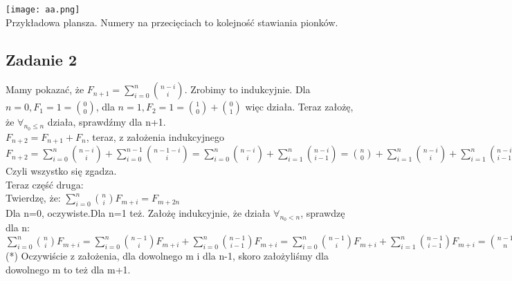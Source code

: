 \documentclass[a4paper]{article}
\begin{document}
\texttt{[image: aa.png]}\\
\small Przykładowa plansza. Numery na przecięciach to kolejność stawiania pionków.

\subsection*{Zadanie 2}
Mamy pokazać, że \Large $F_{n+1}=\sum\limits_{i=0}^{n} {n-i \choose i}$. \normalsize Zrobimy to indukcyjnie. Dla $n=0, F_1=1={0 \choose 0}$, dla $n=1, F_2=1={1 \choose 0}+{0 \choose 1}$ więc działa. Teraz założę, że $\forall_{n_0 \leq n}$ działa, sprawdźmy dla n+1.\\
$F_{n+2}=F_{n+1}+F_{n}$, teraz, z założenia indukcyjnego $F_{n+2}=\sum\limits_{i=0}^{n} {n-i \choose i} + \sum\limits_{i=0}^{n-1} {n-1-i \choose i} = \sum\limits_{i=0}^{n} {n-i \choose i} + \sum\limits_{i=1}^{n} {n-i \choose i-1} = {n \choose 0} + \sum\limits_{i=1}^{n} {n-i \choose i} + \sum\limits_{i=1}^{n} {n-i \choose i-1} = {n \choose 0} + [\sum\limits_{i=1}^{n} {n-i \choose i} + {n-i \choose i-1}] = {n \choose 0} + \sum\limits_{i=1}^{n} {n-i+1 \choose i} = {n+1 \choose 0} + \sum\limits_{i=1}^{n} {n-i+1 \choose i} = \sum\limits_{i=0}^{n} {n-i+1 \choose i} = {0 \choose n+1} + \sum\limits_{i=0}^{n} {n-i+1 \choose i} = \sum\limits_{i=0}^{n+1} {n-i+1 \choose i}$\\
Czyli wszystko się zgadza. \\
Teraz część druga:\\
Twierdzę, że: $\sum_{i=0}^n {n \choose i} F_{m+i} = F_{m+2n}$\\
Dla n=0, oczywiste.Dla n=1 też. Założę indukcyjnie, że działa $\forall_{n_0 < n}$, sprawdzę dla n:\\
$\displaystyle \sum_{i=0}^n {n \choose i} F_{m+i} = \sum_{i=0}^n {n-1 \choose i} F_{m+i} + \sum_{i=0}^n {n-1 \choose i-1} F_{m+i} = \sum_{i=0}^n {n-1 \choose i} F_{m+i} + \sum_{i=1}^n {n-1 \choose i-1} F_{m+i} = {n-1 \choose n} \sum_{i=0}^{n-1} {n-1 \choose i} F_{m+i} + \sum_{i=0}^{n-1} {n-1 \choose i} F_{m+i+1} \stackrel{*}{=} 0 + F_{m+2n-2} + F_{m+1+2n-2} = F_{m+2n}$\\
(*) Oczywiście z założenia, dla dowolnego m i dla n-1, skoro założyliśmy dla dowolnego m to też dla m+1.
\end{document}
